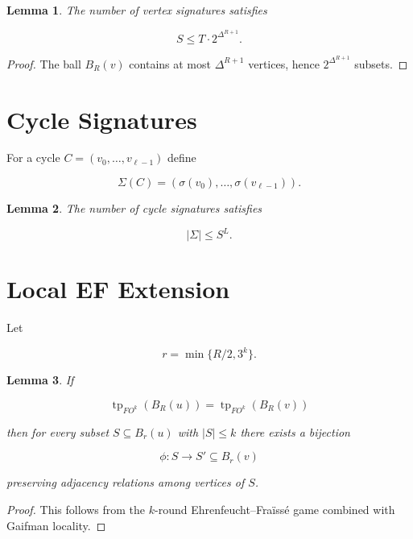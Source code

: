 \documentclass[11pt]{article}
\newtheorem{lemma}{Lemma}
\begin{document}
\begin{lemma}

The number of vertex signatures satisfies

\[
S\le T\cdot 2^{\Delta^{R+1}}.
\]

\end{lemma}

\begin{proof}

The ball $B_R(v)$ contains at most $\Delta^{R+1}$ vertices,
hence $2^{\Delta^{R+1}}$ subsets.

\end{proof}

\section{Cycle Signatures}

For a cycle $C=(v_0,\dots,v_{\ell-1})$ define

\[
\Sigma(C)=(\sigma(v_0),\dots,\sigma(v_{\ell-1})).
\]

\begin{lemma}

The number of cycle signatures satisfies

\[
|\Sigma|\le S^L.
\]

\end{lemma}

\section{Local EF Extension}

Let

\[
r=\min\{R/2,3^k\}.
\]

\begin{lemma}

If

\[
\operatorname{tp}_{FO^k}(B_R(u))
=
\operatorname{tp}_{FO^k}(B_R(v))
\]

then for every subset $S\subseteq B_r(u)$ with $|S|\le k$
there exists a bijection

\[
\phi:S\to S'\subseteq B_r(v)
\]

preserving adjacency relations among vertices of $S$.

\end{lemma}

\begin{proof}

This follows from the $k$-round Ehrenfeucht--Fra\"iss\'e game
combined with Gaifman locality.

\end{proof}
\end{document}
